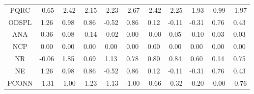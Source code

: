 \documentclass[11pt,a4paper]{report}
\begin{document}
\begin{longtable}{ | c || c | c | c | c | c | c | c | c | c || c |}
PQRC &  \cellcolor[HTML]{FFEFEF} -0.65 &  \cellcolor[HTML]{FFBFBF} -2.42 &  \cellcolor[HTML]{FFC7C7} -2.15 &  \cellcolor[HTML]{FFC7C7} -2.23 &  \cellcolor[HTML]{FFBFBF} -2.67 &  \cellcolor[HTML]{FFBFBF} -2.42 &  \cellcolor[HTML]{FFC7C7} -2.25 &  \cellcolor[HTML]{FFCFCF} -1.93 &  \cellcolor[HTML]{FFE7E7} -0.99 &  \cellcolor[HTML]{FFCFCF} -1.97 \\
ODSPL &  \cellcolor[HTML]{DFDFFF} 1.26 &  \cellcolor[HTML]{E7E7FF} 0.98 &  \cellcolor[HTML]{E7E7FF} 0.86 &  \cellcolor[HTML]{FFEFEF} -0.52 &  \cellcolor[HTML]{E7E7FF} 0.86 &  \cellcolor[HTML]{FFFFFF} 0.12 &  \cellcolor[HTML]{FFFFFF} -0.11 &  \cellcolor[HTML]{FFF7F7} -0.31 &  \cellcolor[HTML]{EFEFFF} 0.76 &  \cellcolor[HTML]{F7F7FF} 0.43 \\
ANA &  \cellcolor[HTML]{F7F7FF} 0.36 &  \cellcolor[HTML]{FFFFFF} 0.08 &  \cellcolor[HTML]{FFFFFF} -0.14 &  \cellcolor[HTML]{FFFFFF} -0.02 &  \cellcolor[HTML]{FFFFFF} 0.00 &  \cellcolor[HTML]{FFFFFF} -0.00 &  \cellcolor[HTML]{FFFFFF} 0.05 &  \cellcolor[HTML]{FFFFFF} -0.10 &  \cellcolor[HTML]{FFFFFF} 0.03 &  \cellcolor[HTML]{FFFFFF} 0.03 \\
NCP &  \cellcolor[HTML]{FFFFFF} 0.00 &  \cellcolor[HTML]{FFFFFF} 0.00 &  \cellcolor[HTML]{FFFFFF} 0.00 &  \cellcolor[HTML]{FFFFFF} 0.00 &  \cellcolor[HTML]{FFFFFF} 0.00 &  \cellcolor[HTML]{FFFFFF} 0.00 &  \cellcolor[HTML]{FFFFFF} 0.00 &  \cellcolor[HTML]{FFFFFF} 0.00 &  \cellcolor[HTML]{FFFFFF} 0.00 &  \cellcolor[HTML]{FFFFFF} 0.00 \\
NR &  \cellcolor[HTML]{FFFFFF} -0.06 &  \cellcolor[HTML]{CFCFFF} 1.85 &  \cellcolor[HTML]{EFEFFF} 0.69 &  \cellcolor[HTML]{DFDFFF} 1.13 &  \cellcolor[HTML]{EFEFFF} 0.78 &  \cellcolor[HTML]{E7E7FF} 0.80 &  \cellcolor[HTML]{E7E7FF} 0.84 &  \cellcolor[HTML]{EFEFFF} 0.60 &  \cellcolor[HTML]{FFFFFF} 0.14 &  \cellcolor[HTML]{EFEFFF} 0.75 \\
NE &  \cellcolor[HTML]{DFDFFF} 1.26 &  \cellcolor[HTML]{E7E7FF} 0.98 &  \cellcolor[HTML]{E7E7FF} 0.86 &  \cellcolor[HTML]{FFEFEF} -0.52 &  \cellcolor[HTML]{E7E7FF} 0.86 &  \cellcolor[HTML]{FFFFFF} 0.12 &  \cellcolor[HTML]{FFFFFF} -0.11 &  \cellcolor[HTML]{FFF7F7} -0.31 &  \cellcolor[HTML]{EFEFFF} 0.76 &  \cellcolor[HTML]{F7F7FF} 0.43 \\
PCONN &  \cellcolor[HTML]{FFDFDF} -1.31 &  \cellcolor[HTML]{FFE7E7} -1.00 &  \cellcolor[HTML]{FFDFDF} -1.23 &  \cellcolor[HTML]{FFDFDF} -1.13 &  \cellcolor[HTML]{FFE7E7} -1.00 &  \cellcolor[HTML]{FFEFEF} -0.66 &  \cellcolor[HTML]{FFF7F7} -0.32 &  \cellcolor[HTML]{FFF7F7} -0.20 &  \cellcolor[HTML]{FFFFFF} -0.00 &  \cellcolor[HTML]{FFEFEF} -0.76 \\

\end{longtable}
\end{document}
